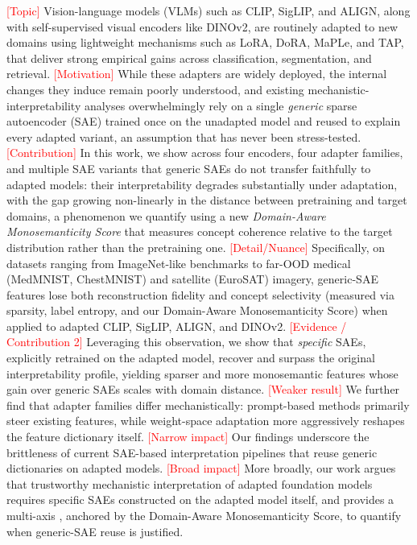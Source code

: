 \textcolor{red}{[Topic]} Vision-language models (VLMs) such as CLIP, SigLIP, and ALIGN, along with self-supervised visual encoders like DINOv2, are routinely adapted to new domains using lightweight mechanisms such as LoRA, DoRA, MaPLe, and TAP, that deliver strong empirical gains across classification, segmentation, and retrieval. \textcolor{red}{[Motivation]} While these adapters are widely deployed, the internal changes they induce remain poorly understood, and existing mechanistic-interpretability analyses overwhelmingly rely on a single \emph{generic} sparse autoencoder (SAE) trained once on the unadapted model and reused to explain every adapted variant, an assumption that has never been stress-tested. \textcolor{red}{[Contribution]} In this work, we show across four encoders, four adapter families, and multiple SAE variants that generic SAEs do not transfer faithfully to adapted models: their interpretability degrades substantially under adaptation, with the gap growing non-linearly in the distance between pretraining and target domains, a phenomenon we quantify using a new \emph{Domain-Aware Monosemanticity Score} that measures concept coherence relative to the target distribution rather than the pretraining one. \textcolor{red}{[Detail/Nuance]} Specifically, on datasets ranging from ImageNet-like benchmarks to far-OOD medical (MedMNIST, ChestMNIST) and satellite (EuroSAT) imagery, generic-SAE features lose both reconstruction fidelity and concept selectivity (measured via sparsity, label entropy, and our Domain-Aware Monosemanticity Score) when applied to adapted CLIP, SigLIP, ALIGN, and DINOv2. \textcolor{red}{[Evidence / Contribution 2]} Leveraging this observation, we show that \emph{specific} SAEs, explicitly retrained on the adapted model, recover and surpass the original interpretability profile, yielding sparser and more monosemantic features whose gain over generic SAEs scales with domain distance. \textcolor{red}{[Weaker result]} We further find that adapter families differ mechanistically: prompt-based methods primarily steer existing features, while weight-space adaptation more aggressively reshapes the feature dictionary itself. \textcolor{red}{[Narrow impact]} Our findings underscore the brittleness of current SAE-based interpretation pipelines that reuse generic dictionaries on adapted models. \textcolor{red}{[Broad impact]} More broadly, our work argues that trustworthy mechanistic interpretation of adapted foundation models requires specific SAEs constructed on the adapted model itself, and provides a multi-axis                                            , anchored by the Domain-Aware Monosemanticity Score, to quantify when generic-SAE reuse is justified.